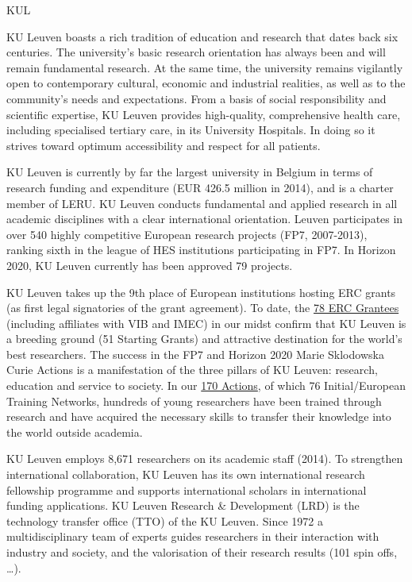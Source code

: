 \begin{sitedescription}{KUL} \label{desc:KUL}

KU Leuven boasts a rich tradition of education and research that dates back six
centuries. The university's basic research orientation has always been and will
remain fundamental research. At the same time, the university remains vigilantly
open to contemporary cultural, economic and industrial realities, as well as to
the community's needs and expectations. From a basis of social responsibility
and scientific expertise, KU Leuven provides high-quality, comprehensive health
care, including specialised tertiary care, in its University Hospitals. In doing
so it strives toward optimum accessibility and respect for all patients.

KU Leuven is currently by far the largest university in Belgium in terms of
research funding and expenditure (EUR 426.5 million in 2014), and is a charter
member of LERU. KU Leuven conducts fundamental and applied research in all
academic disciplines with a clear international orientation.  Leuven
participates in over 540 highly competitive European research projects (FP7,
2007-2013), ranking sixth in the league of HES institutions participating in
FP7. In Horizon 2020, KU Leuven currently has been approved 79 projects.

KU Leuven takes up the 9th place of European institutions hosting ERC grants (as
first legal signatories of the grant agreement). To date, the
\href{http://www.kuleuven.be/english/research/EU/p/erc}{78 ERC Grantees}
(including affiliates with VIB and IMEC) in our midst confirm that KU Leuven is
a breeding ground (51 Starting Grants) and attractive destination for the
world's best researchers. The success in the FP7 and Horizon 2020 Marie
Sklodowska Curie Actions is a manifestation of the three pillars of KU Leuven:
research, education and service to society. In our
\href{http://www.kuleuven.be/english/research/EU/p/horizon2020/es/msca}{170
Actions}, of which 76 Initial/European Training Networks, hundreds of young
researchers have been trained through research and have acquired the necessary
skills to transfer their knowledge into the world outside academia.


KU Leuven employs 8,671 researchers on its academic staff (2014). To strengthen
international collaboration, KU Leuven has its own international research
fellowship programme and supports international scholars in international
funding applications. KU Leuven Research \& Development (LRD) is the technology
transfer office (TTO) of the KU Leuven. Since 1972 a multidisciplinary team of
experts guides researchers in their interaction with industry and society, and
the valorisation of their research results (101 spin offs, \dots).


\end{sitedescription}
